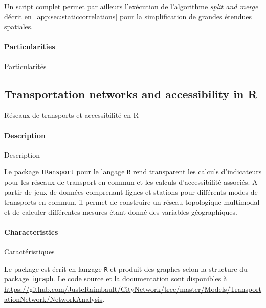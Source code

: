 Un script complet permet par ailleurs l'exécution de l'algorithme \emph{split and merge} décrit en~\ref{app:sec:staticcorrelations} pour la simplification de grandes étendues spatiales.


\paragraph{Particularities}{Particularités}







\subsection{Transportation networks and accessibility in R}{Réseaux de transports et accessibilité en R}


\paragraph{Description}{Description}

Le package \texttt{tRansport} pour le langage \texttt{R} rend transparent les calculs d'indicateurs pour les réseaux de transport en commun et les calculs d'accessibilité associés. A partir de jeux de données comprenant lignes et stations pour différents modes de transports en commun, il permet de construire un réseau topologique multimodal et de calculer différentes mesures étant donné des variables géographiques.


\paragraph{Characteristics}{Caractéristiques}

Le package est écrit en langage \texttt{R} et produit des graphes selon la structure du package \texttt{igraph}. Le code source et la documentation sont disponibles à \url{https://github.com/JusteRaimbault/CityNetwork/tree/master/Models/TransportationNetwork/NetworkAnalysis}.


